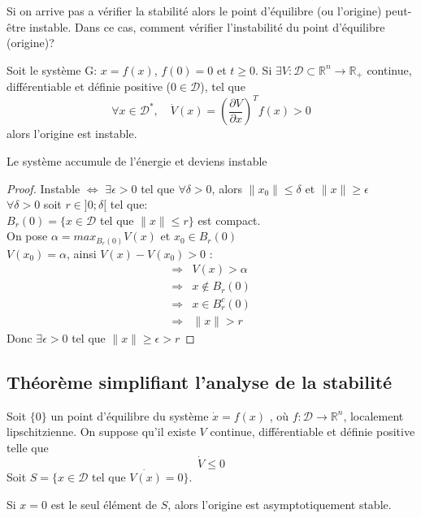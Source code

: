\documentclass[main.tex]{subfiles} \newcommand{\D}{\mathcal{D}}
\begin{document}
Si on arrive pas a vérifier la stabilité alors le point d'équilibre (ou
l'origine) peut-être instable. Dans ce cas, comment vérifier l'instabilité du
point d'équilibre (origine)?\\

\begin{thm} Soit le système G: $x=f(x)$,
	$f(0)=0$ et $t\geq 0$.  Si $\exists V : \D \subset \mathbb{R}^n \rightarrow
	\mathbb{R}_+$ continue, différentiable et définie positive ($0 \in \D$),
	tel que \[\forall x \in \D^*, \quad  \dot{V}(x) = \left( \frac{\partial
V}{\partial x}\right)^T f(x) >0 \] alors l'origine est instable.  \end{thm} Le
système accumule de l'énergie et deviens instable \begin{proof} Instable
	$\Leftrightarrow$ $\exists \epsilon>0$ tel que $\forall \delta >0$, alors
	$\|x_0\| \leq \delta$ et $\|x\| \geq \epsilon$\\

  $\forall \delta > 0$ soit $r \in ]0;\delta[$ tel que:\\ $B_r(0) = \{ x\in \D$
	tel que $ \|x\| \leq r \}$ est compact.\\ On pose $\alpha = max_{B_r(0)}
	V(x)$ et $x_0 \in B_r(0)$\\ $V(x_0) = \alpha$, ainsi $V(x) - V(x_0) >0$ :
	\begin{align*} \Rightarrow & V(x) > \alpha\\ \Rightarrow & x \notin B_r(0)
	\\ \Rightarrow & x \in B_r^c(0)\\ \Rightarrow & \|x\|> r \end{align*} Donc
$\exists \epsilon >0$ tel que $\|x\| \geq \epsilon > r$ \end{proof}
\subsection{Théorème simplifiant l'analyse de la stabilité}


\begin{thm} Soit
	$\{0\}$ un point d'équilibre du système $\dot{x} = f(x)$ , où $f:\D
	\rightarrow \mathbb{R}^n$, localement lipschitzienne. On suppose qu'il
	existe $V$ continue, différentiable et définie positive telle que \[\dot{V}
	\leq 0\] Soit $S = \{x \in \D$ tel que $\dot{V(x)} = 0\}$.

  Si $x=0$ est le seul élément de $S$, alors l'origine est asymptotiquement
stable.  \end{thm}
\end{document}

